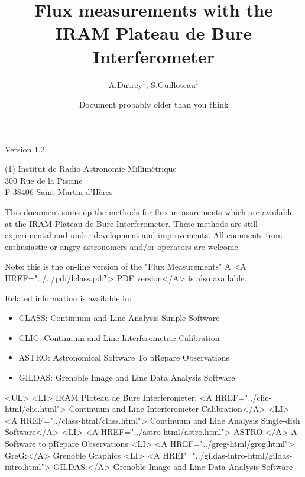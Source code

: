 \documentclass[11pt]{article}
\title {Flux measurements with the \\
  IRAM Plateau de Bure Interferometer}%
\author {A.Dutrey$^1$, S.Guilloteau$^1$}%
\date{Document probably older than you think}%
\begin{document}
\maketitle{}

\begin{center}
  Version 1.2
\end{center}

\begin{center}
  (1) Institut de Radio Astronomie Millim\'etrique\\
  300 Rue de la Piscine\\
  F-38406 Saint Martin d'H\`eres
\end{center}

This document sums up the methods for flux measurements which are available
at the IRAM Plateau de Bure Interferometer.  These methods are still
experimental and under development and improvements.  All comments from
enthusiastic or angry astronomers and/or operators are welcome.

\begin{rawhtml}
  Note: this is the on-line version of the "Flux Measurements" A <A
  HREF="../../pdf/lclass.pdf"> PDF version</A> is also available.
\end{rawhtml}

Related information is available in:
\begin{latexonly}
\begin{itemize}
\item{CLASS: Continuum and Line Analysis Simple Software}
\item{CLIC: Continuum and Line Interferometric Calibration}
\item{ASTRO: Astronomical Software To pRepare Observations}
\item{GILDAS: Grenoble Image and Line Data Analysis Software}
\end{itemize}
\end{latexonly}

\begin{rawhtml}
  <UL>
  <LI> IRAM Plateau de Bure Interferometer: <A HREF="../clic-html/clic.html"> Continuum and Line Interferometer Calibration</A>
  <LI> <A HREF="../class-html/class.html"> Continuum and Line Analysis Single-dish Software</A>
  <LI> <A HREF="../astro-html/astro.html"> ASTRO:</A>  A Software to pRepare Observations
  <LI> <A HREF="../greg-html/greg.html"> GreG:</A> Grenoble Graphics
  <LI> <A HREF="../gildas-intro-html/gildas-intro.html"> GILDAS:</A> Grenoble Image and Line Data Analysis Software
\end{rawhtml}
\end{document}
